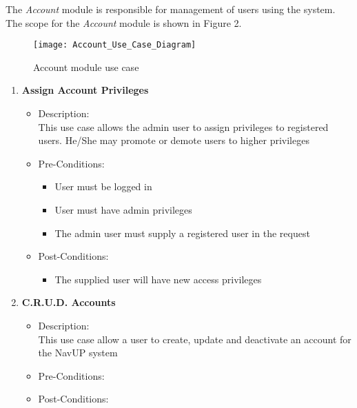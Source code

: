 The \textit{Account} module is responsible for management of users using the system. The scope for the \textit{Account} module is shown in Figure 2.  \\[1cm]

\begin{figure}[h]
	\texttt{[image: Account\_Use\_Case\_Diagram]}
	\caption{Account module use case}
\end{figure}

\begin{enumerate}
	\item \textbf{Assign Account Privileges}
	\begin{itemize}
		\item Description: \\
		This use case allows the admin user to assign privileges to registered users. He/She may promote or demote users to higher privileges 
		\item Pre-Conditions: \\
		\begin{itemize}
		\item User must be logged in
		\item User must have admin privileges
		\item The admin user must supply a registered user in the request
		
		\end{itemize}
		\item Post-Conditions: \\
		
		\begin{itemize}
		\item The supplied user will have new access privileges 
		
		\end{itemize}
	
	\end{itemize}
	
	\item \textbf{C.R.U.D. Accounts}
	\begin{itemize}
		\item Description: \\
		This use case allow a user to create, update and deactivate an account for the NavUP system
		\item Pre-Conditions: \\
		
		\item Post-Conditions: \\
	

\end{itemize}
\end{enumerate}
